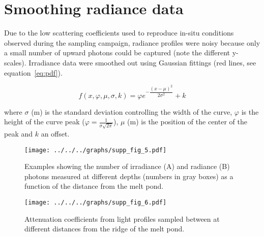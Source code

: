 \documentclass[12pt,a4paper]{scrartcl}
\begin{document}
\clearpage
\newpage

\section*{Smoothing radiance data}

Due to the low scattering coefficients used to reproduce in-situ conditions observed during the sampling campaign, radiance profiles were noisy because only a small number of upward photons could be captured (note the different y-scales). Irradiance data were smoothed out using Gaussian fittings (red lines, see equation~\ref{eq:pdf}).

\begin{equation}
	\label{eq:pdf}
	f(x,\varphi,\mu,\sigma, k) = \varphi e^{-\dfrac{(x-\mu)^2}{2 \sigma^2}} + k
\end{equation}

where $\sigma$ (m) is the standard deviation controlling the width of the curve, $\varphi$ is the height of the curve peak ($\varphi = \frac{1}{\sigma\sqrt{2\pi}}$), $\mu$ (m) is the position of the center of the peak and $k$ an offset.

\begin{figure}[h]
	\centering
	\texttt{[image: ../../../graphs/supp\_fig\_5.pdf]}
	\caption{Examples showing the number of irradiance (A) and radiance (B) photons measured at different depths (numbers in gray boxes) as a function of the distance from the melt pond.}
\end{figure}

\clearpage
\newpage

\begin{figure}[h]
	\centering
	\texttt{[image: ../../../graphs/supp\_fig\_6.pdf]}
	\caption{Attenuation coefficients from light profiles sampled between at different distances from the ridge of the melt pond.}
\end{figure}

\clearpage
\printbibliography
\end{document}
